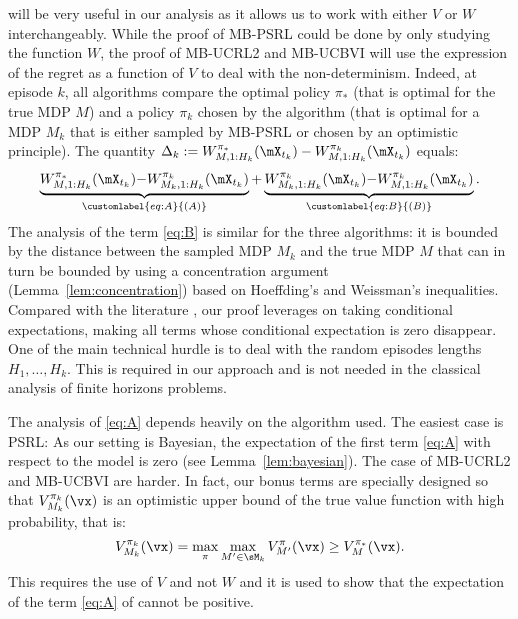  will be very useful in our analysis as it allows us to work with either $V$ or $W$ interchangeably. While the proof of MB-PSRL could be done by only studying the function $W$, the proof of MB-UCRL2 and MB-UCBVI will use the expression of the regret as a function of $V$ to deal with the non-determinism. Indeed, at episode $k$, all algorithms compare the optimal policy $\pi_*$ (that is optimal for the true MDP $M$) and a policy $\pi_k$ chosen by the algorithm (that is optimal for a MDP $M_k$ that is either sampled by MB-PSRL or chosen by an optimistic principle).  The quantity $\Delta_k := W_{M,1:H_k}^{\pi_*}(\mX_{t_k}) - W_{M,1:H_k}^{\pi_k}(\mX_{t_k})$ equals:
\begin{align}
    \underbrace{W_{M,1:H_k}^{\pi_*}(\mX_{t_k}) {-} W_{M_k,1:H_k}^{\pi_k}(\mX_{t_k})}_{\customlabel{eq:A}{(A)}}%
    + \underbrace{W_{M_k,1:H_k}^{\pi_k}(\mX_{t_k}) {-} W_{M,1:H_k}^{\pi_k}(\mX_{t_k})}_{\customlabel{eq:B}{(B)}}.
    \label{eq:proofAB}%
\end{align}
The analysis of the term \ref{eq:B} is similar for the three algorithms: it is bounded by the distance between the sampled MDP $M_k$ and the true MDP $M$ that can in turn be bounded by using a concentration argument (Lemma~\ref{lem:concentration}) based on Hoeffding's and Weissman's inequalities.  Compared with the literature \cite{azar2017minimax,ouyang2017learning}, our proof leverages on taking conditional expectations, making all terms whose conditional expectation is zero disappear. One of the main technical hurdle is to deal with the random episodes lengths $H_1,\ldots, H_k$.   This is required in our approach and is not needed in the classical analysis of finite horizons problems.

The analysis of \ref{eq:A} depends heavily on the algorithm used. The easiest case is PSRL: As our setting is Bayesian, the expectation of the first term \ref{eq:A} with respect to the model is zero (see Lemma~\ref{lem:bayesian}).   The case of MB-UCRL2 and MB-UCBVI are harder. In fact, our bonus terms are specially designed so that $V_{M_k}^{\pi_k}(\vx)$ is an optimistic upper bound of the true value function with high probability, that is:
\begin{align}
    \label{eq:optimism}
    V_{M_k}^{\pi_k}(\vx) = \max_{\pi} \max_{M'\in\sM_k} V_{M'}^{\pi}(\vx) \ge V_M^{\pi_*}(\vx).
\end{align}
This requires the use of $V$ and not $W$ and it is used to show that the expectation of the term \ref{eq:A} of  cannot be positive. 

